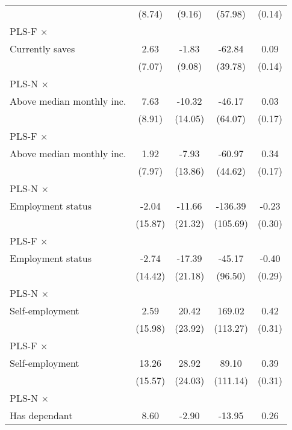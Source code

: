 \begin{table}[htbp]
\begin{tabular}{l*{4}{c}}
                &   (8.74)         &   (9.16)         &  (57.98)         &   (0.14)         \\
\addlinespace
PLS-F $\times$ \\ Currently saves&     2.63         &    -1.83         &   -62.84         &     0.09         \\
                &   (7.07)         &   (9.08)         &  (39.78)         &   (0.14)         \\
\addlinespace
PLS-N $\times$ \\ Above median monthly inc.&     7.63         &   -10.32         &   -46.17         &     0.03         \\
                &   (8.91)         &  (14.05)         &  (64.07)         &   (0.17)         \\
\addlinespace
PLS-F $\times$ \\ Above median monthly inc.&     1.92         &    -7.93         &   -60.97         &     0.34\sym{**} \\
                &   (7.97)         &  (13.86)         &  (44.62)         &   (0.17)         \\
\addlinespace
PLS-N $\times$ \\ Employment status&    -2.04         &   -11.66         &  -136.39         &    -0.23         \\
                &  (15.87)         &  (21.32)         & (105.69)         &   (0.30)         \\
\addlinespace
PLS-F $\times$ \\ Employment status&    -2.74         &   -17.39         &   -45.17         &    -0.40         \\
                &  (14.42)         &  (21.18)         &  (96.50)         &   (0.29)         \\
\addlinespace
PLS-N $\times$ \\ Self-employment&     2.59         &    20.42         &   169.02         &     0.42         \\
                &  (15.98)         &  (23.92)         & (113.27)         &   (0.31)         \\
\addlinespace
PLS-F $\times$ \\ Self-employment&    13.26         &    28.92         &    89.10         &     0.39         \\
                &  (15.57)         &  (24.03)         & (111.14)         &   (0.31)         \\
\addlinespace
PLS-N $\times$ \\ Has dependant&     8.60         &    -2.90         &   -13.95         &     0.26         \\

\end{tabular}
\end{table}
